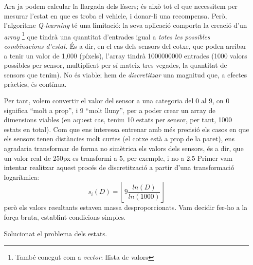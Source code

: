 Ara ja podem calcular la llargada dels làsers; és això tot el que necessitem per mesurar l'estat
en que es troba el vehicle, i donar-li una recompensa. Però, l'algoritme \emph{Q-learning} té una limitació: la seva aplicació
comporta la creació d'un \emph{array} \footnote{També conegut com a \emph{vector}: llista de valors}
que tindrà una quantitat d'entrades igual a \emph{totes les possibles combinacions d'estat}. És a dir,
en el cas dels sensors del cotxe, que poden arribar a tenir un valor de 1,000 (píxels), l'array
tindrà \num{1000000000} entrades (1000 valors possibles per sensor, multiplicat per sí mateix tres vegades, la quantitat
de sensors que tenim). No és viable; hem de \emph{discretitzar} una magnitud que, a efectes pràctics, és contínua.

Per tant, volem convertir el valor del sensor a una categoria del 0 al 9, on 0 significa ``molt a prop'', i 9 ``molt lluny'',
per a poder crear un array de dimensions viables (en aquest cas, tenim 10 estats per sensor, per tant, 1000 estats en total).
Com que ens interessa entrenar amb més precisió els casos en que els sensors tenen distàncies molt curtes (el cotxe està a 
prop de la paret), ens agradaria transformar de forma no simètrica els valors dels sensors, és a dir, que un valor real de
250px es transformi a 5, per exemple, i no a 2.5
Primer vam intentar realitzar aquest procés de discretització a partir d'una transformació logarítmica:
\[
s_i(D) = \left\lfloor 9 \frac{ln(D)}{ln(1000)} \right\rfloor
\]
però els valors resultants estaven massa desproporcionats. Vam decidir fer-ho a la força bruta, establint condicions
simples. 

Solucionat el problema dels estats.














